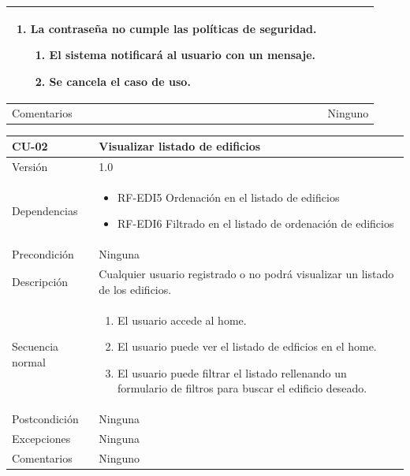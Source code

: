 \documentclass[12pt, a4paper, twoside]{article}
\begin{document}
\begin{longtable}{ |l|l| }
{\begin{enumerate}
\begin{enumerate}
        \item Se cancela el caso de uso.
      \end{enumerate}
      \item La contraseña no cumple las políticas de seguridad.
      \begin{enumerate}
        \item El sistema notificará al usuario con un mensaje.
        \item Se cancela el caso de uso.
      \end{enumerate}
    \end{enumerate}
  } \\ \hline
  Comentarios & Ninguno \\ \hline
\end{longtable}

\begin{longtable}{ |l|l| }
  \hline
  CU-02 & Visualizar listado de edificios \\ \hline
  Versión & 1.0 \\ \hline
  Dependencias & 
  \parbox{.7\textwidth}{
    \begin{itemize}
      \item RF-EDI5 Ordenación en el listado de edificios
      \item RF-EDI6 Filtrado en el listado de ordenación de edificios
    \end{itemize}
  } \\ \hline
  Precondición & Ninguna \\ \hline
  Descripción & 
  \parbox{.7\textwidth}{
    \vspace{.5\baselineskip}
    Cualquier usuario registrado o no podrá visualizar un listado de los edificios.
    \vspace{.5\baselineskip}
  } \\ \hline
  Secuencia normal & 
  \parbox{.7\textwidth}{
    \begin{enumerate}
      \item El usuario accede al home.
      \item El usuario puede ver el listado de edficios en el home.
      \item El usuario puede filtrar el listado rellenando un formulario de filtros para buscar el edificio deseado.
    \end{enumerate}
  } \\ \hline
  Postcondición & Ninguna \\ \hline
  Excepciones & Ninguna \\ \hline
  Comentarios & Ninguno \\ \hline
\end{longtable}
\end{document}
